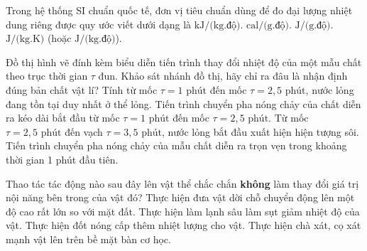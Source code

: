 \begin{ex}	Trong hệ thống SI chuẩn quốc tế, đơn vị tiêu chuẩn dùng để đo đại lượng nhiệt dung riêng được quy ước viết dưới dạng là
	\choice
	{$\text{kJ/(kg.độ)}$.}
	{$\text{cal/(g.độ)}$.}
	{$\text{J/(g.độ)}$.}
	{\True $\text{J/(kg.K)}$ (hoặc $\text{J/(kg.độ)}$).}
\end{ex}

\begin{ex}	Đồ thị hình vẽ đính kèm biểu diễn tiến trình thay đổi nhiệt độ của một mẫu chất theo trục thời gian $\tau$ đun. Khảo sát nhánh đồ thị, hãy chỉ ra đâu là nhận định đúng bản chất vật lí?
	\choice
	{Tính từ mốc $\tau = 1\text{ phút}$ đến mốc $\tau = 2,5\text{ phút}$, nước lỏng đang tồn tại duy nhất ở thể lỏng.}
	{\True Tiến trình chuyển pha nóng chảy của chất diễn ra kéo dài bắt đầu từ mốc $\tau = 1\text{ phút}$ đến mốc $\tau = 2,5\text{ phút}$.}
	{Từ mốc $\tau = 2,5\text{ phút}$ đến vạch $\tau = 3,5\text{ phút}$, nước lỏng bắt đầu xuất hiện hiện tượng sôi.}
	{Tiến trình chuyển pha nóng chảy của mẫu chất diễn ra trọn vẹn trong khoảng thời gian 1 phút đầu tiên.}
\end{ex}

\begin{ex}	Thao tác tác động nào sau đây lên vật thể chắc chắn \textbf{không} làm thay đổi giá trị nội năng bên trong của vật đó?
	\choice
	{\True Thực hiện đưa vật dời chỗ chuyển động lên một độ cao rất lớn so với mặt đất.}
	{Thực hiện làm lạnh sâu làm sụt giảm nhiệt độ của vật.}
	{Thực hiện đốt nóng cấp thêm nhiệt lượng cho vật.}
	{Thực hiện chà xát, cọ xát mạnh vật lên trên bề mặt bàn cơ học.}
\end{ex}

